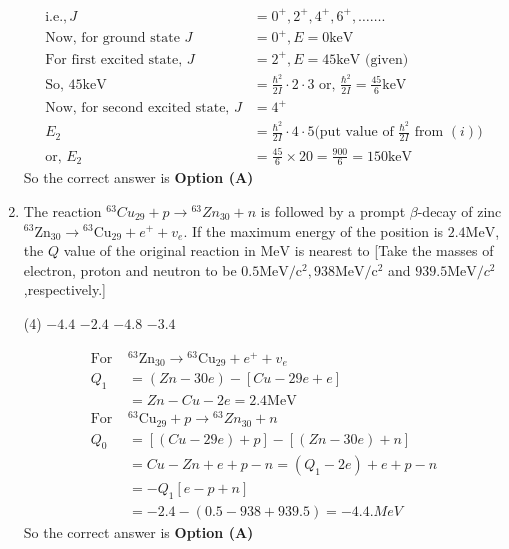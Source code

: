 \begin{enumerate}
\begin{answer}
\begin{align*}
\text{i.e.}, J&=0^{+}, 2^{+}, 4^{+}, 6^{+}, \ldots \ldots .\\
\text{Now, for ground state }J&=0^{+}, E=0 \mathrm{keV}\\
\text{For first excited state, }J&=2^{+}, E=45 \mathrm{keV}\text{ (given)}\\
\text{So, }45 \mathrm{keV}&=\frac{\hbar^{2}}{2 I} \cdot 2 \cdot 3\text{ or, }\frac{\hbar^{2}}{2 I}=\frac{45}{6} \mathrm{keV}\\
\text{Now, for second excited state, }J&=4^{+}\\
E_{2}&=\frac{\hbar^{2}}{2 I} \cdot 4 \cdot 5 \text{(put value of }\frac{\hbar^{2}}{2 I}\text{ from } (i))\\
\text{or, }E_{2}&=\frac{45}{6} \times 20=\frac{900}{6}=150 \mathrm{keV}
\end{align*}
So the correct answer is \textbf{Option (A)}
\end{answer}	
	\item The reaction ${ }^{63} C u_{29}+p \rightarrow{ }^{63} Z n_{30}+n$ is followed by a prompt $\beta$-decay of zinc ${ }^{63} \mathrm{Zn}_{30} \rightarrow{ }^{63} \mathrm{Cu}_{29}+e^{+}+v_{e} .$ If the maximum energy of the position is $2.4 \mathrm{MeV}$, the $Q$ value of the original reaction in $\mathrm{MeV}$ is nearest to
	[Take the masses of electron, proton and neutron to be $0.5 \mathrm{MeV} / \mathrm{c}^{2}, 938 \mathrm{MeV} / \mathrm{c}^{2}$ and $939.5 \mathrm{MeV} / c^{2}$,respectively.]
{	}
\begin{tasks}(4)
\task[\textbf{A.}] $-4.4$
\task[\textbf{B.}] $-2.4$
\task[\textbf{C.}] $-4.8$
\task[\textbf{D.}] $-3.4$
\end{tasks}
\begin{answer}
\begin{align*}
\text{For }&{ }^{63} \mathrm{Zn}_{30} \rightarrow{ }^{63} \mathrm{Cu}_{29}+e^{+}+v_{e}\\
Q_{1}&=(Z n-30 e)-[C u-29 e+e]\\&=Z n-C u-2 e=2.4 \mathrm{MeV}\\
\text{For }&{ }^{63} \mathrm{Cu}_{29}+p \rightarrow{ }^{63} Z n_{30}+n\\
Q_{0}&=[(C u-29 e)+p]-[(Z n-30 e)+n]\\
&=C u-Z n+e+p-n=\left( Q_1-2e\right)+e+p-n \\&=-Q_1\left[ e-p+n\right] \\
&=-2.4-\left( 0.5-938+939.5\right) =-4.4.MeV
\end{align*}
So the correct answer is \textbf{Option (A)}

\end{answer}
\end{enumerate}
